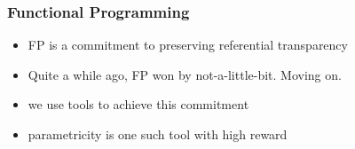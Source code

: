 \begin{frame}
\frametitle{Functional Programming}
\begin{itemize}
  \item<1> FP is a commitment to preserving referential transparency
  \item<2> Quite a while ago, FP won by not-a-little-bit. Moving on.
  \item<3> we use tools to achieve this commitment
  \item<4> parametricity is one such tool with high reward
\end{itemize}
\end{frame}
